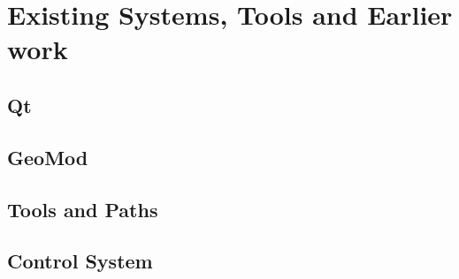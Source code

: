 \chapter{Existing Systems, Tools and Earlier work}

\section{Qt}

\section{GeoMod}

\section{Tools and Paths}

\section{Control System}


